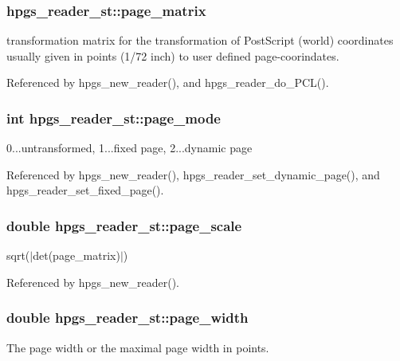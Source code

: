 \subsubsection[{page\_\-matrix}]{ {\bf hpgs\_\-reader\_\-st::page\_\-matrix}}\label{structhpgs__reader__st_a57eabb10e99d2b73f539d9d48f2e75e9}
transformation matrix for the transformation of PostScript (world) coordinates usually given in points (1/72 inch) to user defined page-\/coorindates. 

Referenced by hpgs\_\-new\_\-reader(), and hpgs\_\-reader\_\-do\_\-PCL().

\subsubsection[{page\_\-mode}]{\setlength{\rightskip}{0pt plus 5cm}int {\bf hpgs\_\-reader\_\-st::page\_\-mode}}\label{structhpgs__reader__st_a79244f4b44844514bce58c3ce48d4aa1}
0...untransformed, 1...fixed page, 2...dynamic page 

Referenced by hpgs\_\-new\_\-reader(), hpgs\_\-reader\_\-set\_\-dynamic\_\-page(), and hpgs\_\-reader\_\-set\_\-fixed\_\-page().

\subsubsection[{page\_\-scale}]{\setlength{\rightskip}{0pt plus 5cm}double {\bf hpgs\_\-reader\_\-st::page\_\-scale}}\label{structhpgs__reader__st_a4ed2af3b63c82fbeb325d400f51956a7}
sqrt($|$det(page\_\-matrix)$|$) 

Referenced by hpgs\_\-new\_\-reader().

\subsubsection[{page\_\-width}]{\setlength{\rightskip}{0pt plus 5cm}double {\bf hpgs\_\-reader\_\-st::page\_\-width}}\label{structhpgs__reader__st_af35c4d1eece0d47f368a8c373cc36b8b}
The page width or the maximal page width in points. 

